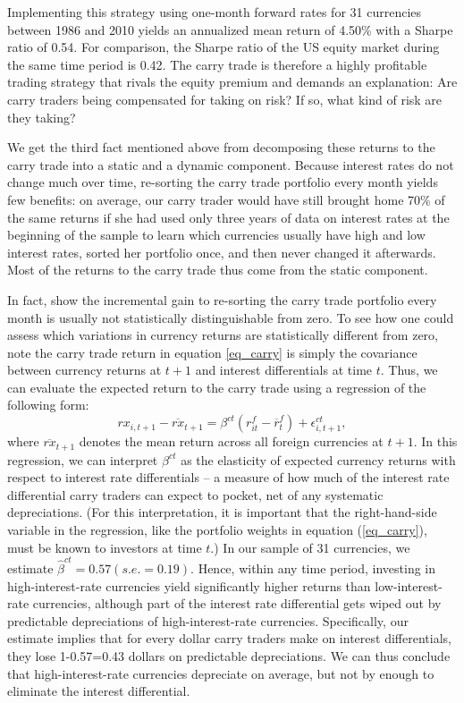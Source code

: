 \documentclass[11pt]{article}
\begin{document}
Implementing this strategy using one-month forward rates for 31 currencies between 1986 and 2010 yields an annualized mean return of 4.50\% with a Sharpe ratio of 0.54. For comparison, the Sharpe ratio of the US equity market during the same time period is 0.42. The carry trade is therefore a highly profitable trading strategy that rivals the equity premium and demands an explanation: Are carry traders being compensated for taking on risk? If so, what kind of risk are they taking?

We get the third fact mentioned above from decomposing these returns to the carry trade into a static and a dynamic component. Because interest rates do not change much over time, re-sorting the carry trade portfolio every month yields few benefits: on average, our carry trader would have still brought home 70\% of the same returns if she had used only three years of data on interest rates at the beginning of the sample to learn which currencies usually have high and low interest rates, sorted her portfolio once, and then never changed it afterwards. Most of the returns to the carry trade thus come from the static component.

In fact, \citet{HassanMano2019} show the incremental gain to re-sorting the carry trade portfolio every month is usually not statistically distinguishable from zero. To see how one could assess which variations in currency returns are statistically different from zero, note the carry trade return in equation \ref{eq_carry} is simply the covariance between currency returns at $t+1$ and interest differentials at time $t$. Thus, we can evaluate the expected return to the carry trade using a regression of the following form:
\begin{equation}
    rx_{i,t+1} - \overline{rx}_{t+1} 
    = \beta^{ct}\left( r^f_{it}-\overline{r}^f_{t}\right) +\epsilon_{i,t+1}^{ct},  \label{eq_ct}
\end{equation} 
where $\overline{rx}_{t+1}$ denotes the mean return across all foreign currencies at $t+1$. In this regression, we can interpret $\beta^{ct}$ as the elasticity of expected currency returns with respect to interest rate differentials -- a measure of how much of the interest rate differential carry traders can expect to pocket, net of any systematic depreciations. (For this interpretation, it is important that the right-hand-side variable in the regression, like the portfolio weights in equation (\ref{eq_carry}), must be known to investors at time $t$.) In our sample of 31 currencies, we estimate $\hat{\beta}^{ct}=0.57 (s.e.=0.19)$. Hence, within any time period, investing in high-interest-rate currencies yield significantly higher returns than low-interest-rate currencies, although part of the interest rate differential gets wiped out by predictable depreciations of high-interest-rate currencies. Specifically, our estimate implies that for every dollar carry traders make on interest differentials, they lose 1-0.57=0.43 dollars on predictable depreciations. We can thus conclude that high-interest-rate currencies depreciate on average, but not by enough to eliminate the interest differential.
\end{document}
